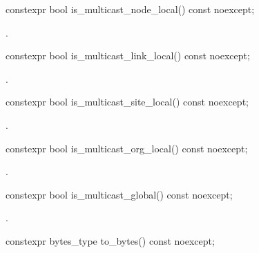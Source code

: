 %
\begin{itemdecl}
constexpr bool is_multicast_node_local() const noexcept;
\end{itemdecl}

\begin{itemdescr}
\pnum
\returns {}.
\end{itemdescr}

%
\begin{itemdecl}
constexpr bool is_multicast_link_local() const noexcept;
\end{itemdecl}

\begin{itemdescr}
\pnum
\returns {}.
\end{itemdescr}

%
\begin{itemdecl}
constexpr bool is_multicast_site_local() const noexcept;
\end{itemdecl}

\begin{itemdescr}
\pnum
\returns {}.
\end{itemdescr}

%
\begin{itemdecl}
constexpr bool is_multicast_org_local() const noexcept;
\end{itemdecl}

\begin{itemdescr}
\pnum
\returns {}.
\end{itemdescr}

%
\begin{itemdecl}
constexpr bool is_multicast_global() const noexcept;
\end{itemdecl}

\begin{itemdescr}
\pnum
\returns {}.
\end{itemdescr}

%
\begin{itemdecl}
constexpr bytes_type to_bytes() const noexcept;
\end{itemdecl}

